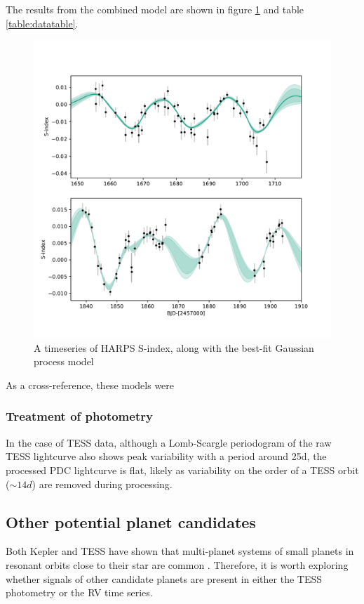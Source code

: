 \documentclass[fleqn,usenatbib]{mnras}
\begin{document}
The results from the combined model are shown in figure \ref{fig:Sindex} and table \ref{table:datatable}.
\begin{figure}
	\includegraphics[width=\columnwidth]{Sindex_RV_training}
    \caption{A timeseries of HARPS S-index, along with the best-fit Gaussian process model}
    \label{fig:Sindex}
\end{figure}

As a cross-reference, these models were

\subsubsection{Treatment of photometry}

In the case of TESS data, although a Lomb-Scargle periodogram of the raw TESS lightcurve also shows peak variability with a period around 25d, the processed PDC lightcurve is flat, likely as variability on the order of a TESS orbit ($\sim 14d$) are removed during processing.

\subsection{Other potential planet candidates}
Both Kepler and TESS have shown that multi-planet systems of small planets in resonant orbits close to their star are common \citep{?}.
Therefore, it is worth exploring whether signals of other candidate planets are present in either the TESS photometry or the RV time series.
\end{document}
